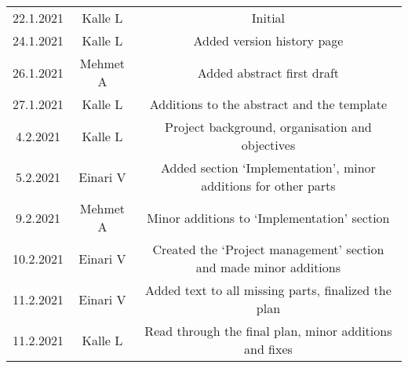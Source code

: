\begin{center}
	\begin{tabular}{ c c c }
		22.1.2021 & Kalle L & Initial \\ 
		24.1.2021 & Kalle L & Added version history page \\
		26.1.2021 & Mehmet A & Added abstract first draft \\ 
		27.1.2021 & Kalle L & Additions to the abstract and the template \\
		4.2.2021 & Kalle L & Project background, organisation and objectives \\ 
		5.2.2021 & Einari V & Added section `Implementation', minor additions for other parts \\
		9.2.2021 & Mehmet A & Minor additions to `Implementation' section \\
		10.2.2021 & Einari V & Created the `Project management' section and made minor additions \\
		11.2.2021 & Einari V & Added text to all missing parts, finalized the plan \\
		11.2.2021 & Kalle L & Read through the final plan, minor additions and fixes
	\end{tabular}
\end{center}